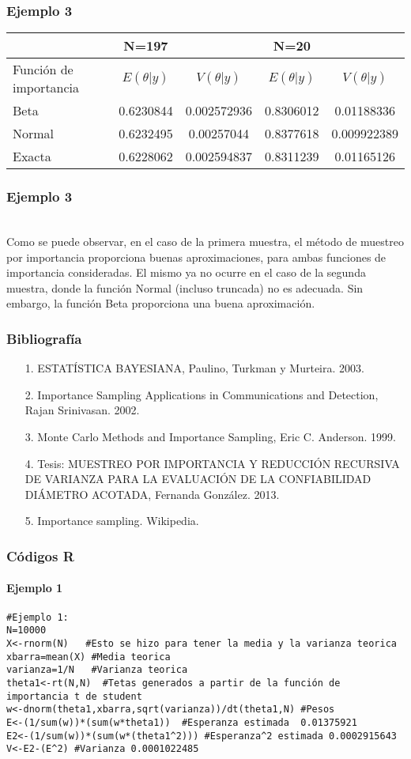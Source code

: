 \documentclass[12pt]{beamer}
\begin{document}
\begin{frame}
\frametitle{Ejemplo 3}
\center
\begin{tabular}{|p{2.2cm}|cc|cc|}
\hline 
 & N=197 &  & N=20 &  \\ 
\hline 
Función de importancia & $E(\theta|y)$ & $V(\theta|y)$ & $E(\theta|y)$ & $V(\theta|y)$ \\ 
\hline 
Beta &  0.6230844 & 0.002572936 & 0.8306012 & 0.01188336 \\ 
\hline 
Normal & 0.6232495 & 0.00257044 & 0.8377618 & 0.009922389 \\ 
\hline 
Exacta & 0.6228062 & 0.002594837 & 0.8311239 & 0.01165126 \\ 
\hline 
\end{tabular} 
\end{frame}


\begin{frame}
\frametitle{Ejemplo 3}
~\\Como se puede observar, en el caso de la primera muestra, el método de muestreo por importancia proporciona buenas aproximaciones, para ambas funciones de importancia consideradas.  El mismo ya no ocurre en el caso de la segunda muestra, donde la función Normal (incluso truncada) no es adecuada. Sin embargo, la función Beta proporciona una buena aproximación. 
\end{frame}

\begin{frame}
\frametitle{Bibliografía}
\begin{itemize}
\item[1.]ESTATÍSTICA BAYESIANA, Paulino, Turkman y Murteira. 2003.
\item[2.]Importance Sampling Applications in Communications and Detection, Rajan Srinivasan. 2002.
\item[3.]Monte Carlo Methods and Importance Sampling, Eric C. Anderson. 1999.
\item[4.]Tesis: MUESTREO POR IMPORTANCIA Y REDUCCIÓN RECURSIVA DE VARIANZA PARA LA EVALUACIÓN DE LA CONFIABILIDAD DIÁMETRO ACOTADA, Fernanda González. 2013.
\item[5.]Importance sampling. Wikipedia.
\end{itemize}
\end{frame}

\begin{frame}[fragile]
\frametitle{Códigos R}
\framesubtitle{Ejemplo 1}
\begin{verbatim}
#Ejemplo 1:
N=10000
X<-rnorm(N)   #Esto se hizo para tener la media y la varianza teorica
xbarra=mean(X) #Media teorica
varianza=1/N   #Varianza teorica
theta1<-rt(N,N)  #Tetas generados a partir de la función de importancia t de student
w<-dnorm(theta1,xbarra,sqrt(varianza))/dt(theta1,N) #Pesos
E<-(1/sum(w))*(sum(w*theta1))  #Esperanza estimada  0.01375921
E2<-(1/sum(w))*(sum(w*(theta1^2))) #Esperanza^2 estimada 0.0002915643
V<-E2-(E^2) #Varianza 0.0001022485
\end{verbatim}
\end{frame}
\end{document}
